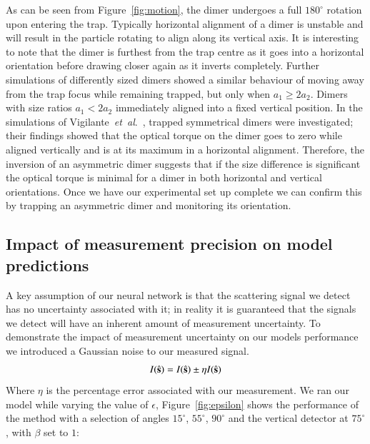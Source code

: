 \documentclass[final,  3p]{elsarticle}
\begin{document}
As can be seen from Figure~\ref{fig:motion}, the dimer undergoes a full $180^{\circ}$ rotation upon entering the trap.  Typically horizontal alignment of a dimer is unstable and will result in the particle rotating to align along its vertical axis.  It is interesting to note that the dimer is furthest from the trap centre as it goes into a horizontal orientation before drawing closer again as it inverts completely. Further simulations of differently sized dimers showed a similar behaviour of moving away from the trap focus while remaining trapped, but only when $a_1 \geq 2a_2$.  Dimers with size ratios $a_1 < 2a_2$ immediately aligned into a fixed vertical position.
%
In the simulations of Vigilante~\emph{et~al}.\ \cite{Vigilante2020Brownian_OT}, trapped symmetrical dimers were investigated; their findings showed that the optical torque on the dimer goes to zero while aligned vertically and is at its maximum in a horizontal alignment. Therefore, the inversion of an asymmetric dimer suggests that if the size difference is significant the optical torque is minimal for a dimer in both horizontal and vertical orientations. Once we have our experimental set up complete we can confirm this by trapping an asymmetric dimer and monitoring its orientation. 


\subsection{Impact of measurement precision on model predictions}
\label{sec:epsilon}

A key assumption of our neural network is that the scattering signal we detect has no uncertainty associated with it; in reality it is guaranteed that the signals we detect will have an inherent amount of measurement uncertainty. To demonstrate the impact of measurement uncertainty on our models performance we introduced a Gaussian noise to our measured signal.
\begin{align}
	I(\hat{\bf s}) = I(\hat{\bf s}) \pm \eta I(\hat{\bf s})
\end{align}
Where $\eta$ is the percentage error associated with our measurement. We ran our model while varying the value of $\epsilon$, Figure~\ref{fig:epsilon} shows the performance of the method with a selection of angles $15^{\circ}$, $55^{\circ}$, $90^{\circ}$ and the vertical detector at $75^{\circ}$, with $\beta$ set to $1$:
\end{document}
